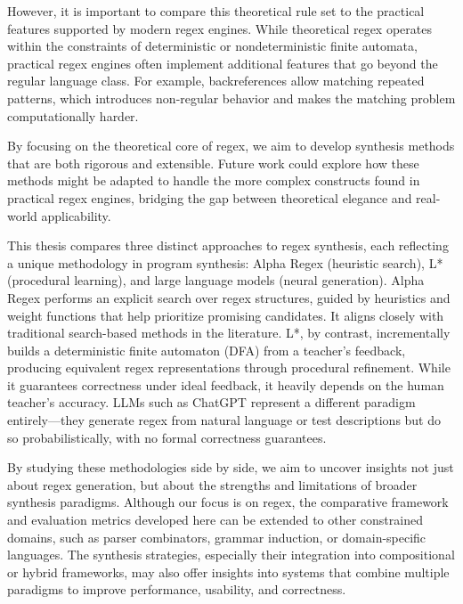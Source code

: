 \indent\indent However, it is important to compare this theoretical rule set to the practical features supported by modern regex engines. While theoretical regex operates within the constraints of deterministic or nondeterministic finite automata, practical regex engines often implement additional features that go beyond the regular language class. For example, backreferences allow matching repeated patterns, which introduces non-regular behavior and makes the matching problem computationally harder.

\indent\indent By focusing on the theoretical core of regex, we aim to develop synthesis methods that are both rigorous and extensible. Future work could explore how these methods might be adapted to handle the more complex constructs found in practical regex engines, bridging the gap between theoretical elegance and real-world applicability.

\indent\indent This thesis compares three distinct approaches to regex synthesis, each reflecting a unique methodology in program synthesis: Alpha Regex (heuristic search), L* (procedural learning), and large language models (neural generation). Alpha Regex performs an explicit search over regex structures, guided by heuristics and weight functions that help prioritize promising candidates. It aligns closely with traditional search-based methods in the literature. L*, by contrast, incrementally builds a deterministic finite automaton (DFA) from a teacher's feedback, producing equivalent regex representations through procedural refinement. While it guarantees correctness under ideal feedback, it heavily depends on the human teacher's accuracy. LLMs such as ChatGPT represent a different paradigm entirely—they generate regex from natural language or test descriptions but do so probabilistically, with no formal correctness guarantees.

\indent\indent By studying these methodologies side by side, we aim to uncover insights not just about regex generation, but about the strengths and limitations of broader synthesis paradigms. Although our focus is on regex, the comparative framework and evaluation metrics developed here can be extended to other constrained domains, such as parser combinators, grammar induction, or domain-specific languages. The synthesis strategies, especially their integration into compositional or hybrid frameworks, may also offer insights into systems that combine multiple paradigms to improve performance, usability, and correctness.

